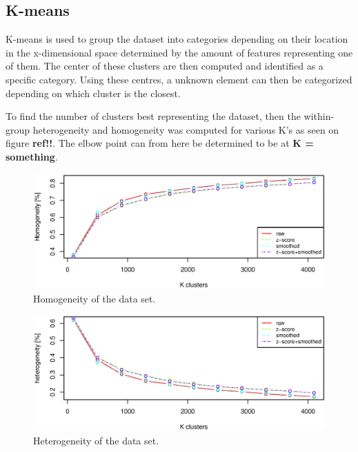 \subsection{K-means}
K-means is used to group the dataset into categories depending on their location in the x-dimensional space determined by the amount of features representing one of them.
The center of these clusters are then computed and identified as a specific category.
Using these centres, a unknown element can then be categorized depending on which cluster is the closest.

To find the number of clusters best representing the dataset, then the within-group heterogeneity and homogeneity was computed for various K's as seen on figure \textbf{ref!!}.
The elbow point can from here be determined to be at \textbf{K = something}.

\begin{figure}
\centering
\includegraphics[width=\textwidth]{graphics/homogenity}
\caption{Homogeneity of the data set.}
\label{fig:homogeneity_kmean}
\end{figure}


\begin{figure}
\centering
\includegraphics[width=\textwidth]{graphics/heterogenity}
\caption{Heterogeneity of the data set.}
\label{fig:heterogeneity_kmean}
\end{figure}

